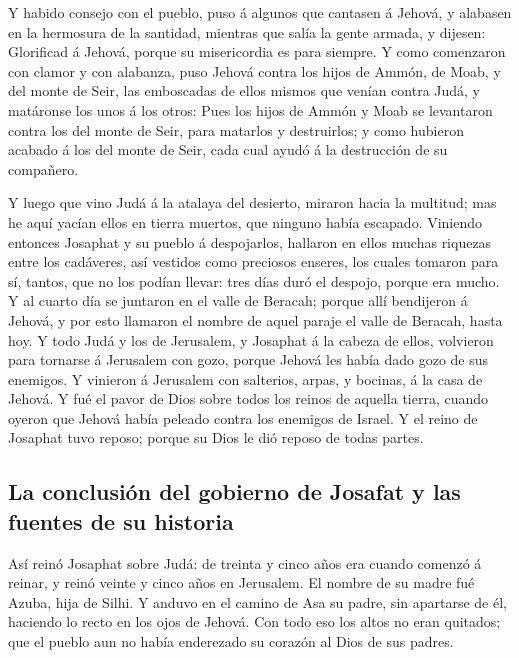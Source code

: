  Y habido consejo con el pueblo, puso á algunos que
cantasen á Jehová, y alabasen en la hermosura de la santidad, mientras
que salía la gente armada, y dijesen: Glorificad á Jehová, porque su
misericordia es para siempre.  Y como comenzaron con
clamor y con alabanza, puso Jehová contra los hijos de Ammón, de Moab, y
del monte de Seir, las emboscadas de ellos mismos que venían contra
Judá, y matáronse los unos á los otros:  Pues los hijos
de Ammón y Moab se levantaron contra los del monte de Seir, para
matarlos y destruirlos; y como hubieron acabado á los del monte de Seir,
cada cual ayudó á la destrucción de su compañero.

 Y luego que vino Judá á la atalaya del desierto, miraron
hacia la multitud; mas he aquí yacían ellos en tierra muertos, que
ninguno había escapado.  Viniendo entonces Josaphat y su
pueblo á despojarlos, hallaron en ellos muchas riquezas entre los
cadáveres, así vestidos como preciosos enseres, los cuales tomaron para
sí, tantos, que no los podían llevar: tres días duró el despojo, porque
era mucho.  Y al cuarto día se juntaron en el valle de
Beracah; porque allí bendijeron á Jehová, y por esto llamaron el nombre
de aquel paraje el valle de Beracah, hasta hoy.  Y todo
Judá y los de Jerusalem, y Josaphat á la cabeza de ellos, volvieron para
tornarse á Jerusalem con gozo, porque Jehová les había dado gozo de sus
enemigos.  Y vinieron á Jerusalem con salterios, arpas, y
bocinas, á la casa de Jehová.  Y fué el pavor de Dios
sobre todos los reinos de aquella tierra, cuando oyeron que Jehová había
peleado contra los enemigos de Israel.  Y el reino de
Josaphat tuvo reposo; porque su Dios le dió reposo de todas partes.

\hypertarget{la-conclusiuxf3n-del-gobierno-de-josafat-y-las-fuentes-de-su-historia}{%
\subsection{La conclusión del gobierno de Josafat y las fuentes de su
historia}\label{la-conclusiuxf3n-del-gobierno-de-josafat-y-las-fuentes-de-su-historia}}

 Así reinó Josaphat sobre Judá: de treinta y cinco años
era cuando comenzó á reinar, y reinó veinte y cinco años en Jerusalem.
El nombre de su madre fué Azuba, hija de Silhi.  Y anduvo
en el camino de Asa su padre, sin apartarse de él, haciendo lo recto en
los ojos de Jehová.  Con todo eso los altos no eran
quitados; que el pueblo aun no había enderezado su corazón al Dios de
sus padres.

